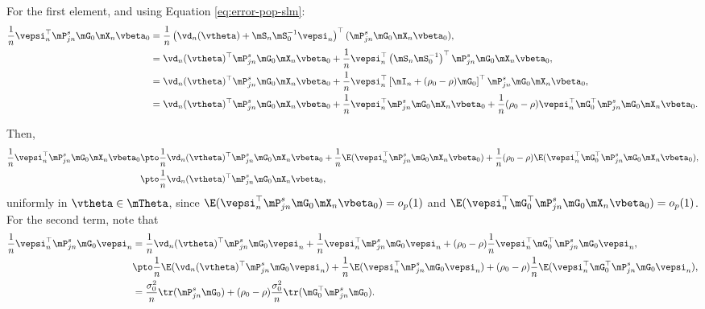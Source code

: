 \documentclass[english,12pt]{book}\usepackage[]{graphicx}\usepackage[]{xcolor}
\begin{document}
For the first element, and using Equation \eqref{eq:error-pop-slm}:
\begin{equation*}
\begin{aligned}
\frac{1}{n}\vepsi_n^\top \mP_{jn}^s\mG_0\mX_n\vbeta_0  & = \frac{1}{n}\left(\vd_n(\vtheta) + \mS_n\mS_0^{-1}\vepsi_n\right)^\top (\mP_{jn}^s\mG_0\mX_n\vbeta_0), \\
& =\vd_n(\vtheta)^\top\mP_{jn}^s\mG_0\mX_n\vbeta_0 + \frac{1}{n}\vepsi_n^\top\left(\mS_n\mS_0^{-1}\right)^\top\mP_{jn}^s\mG_0\mX_n\vbeta_0, \\
& = \vd_n(\vtheta)^\top\mP_{jn}^s\mG_0\mX_n\vbeta_0  + \frac{1}{n}\vepsi_n^\top\left[\mI_n + (\rho_0 - \rho)\mG_0\right]^\top\mP_{jn}^s\mG_0\mX_n\vbeta_0, \\
& = \vd_n(\vtheta)^\top\mP_{jn}^s\mG_0\mX_n\vbeta_0 + \frac{1}{n}\vepsi_n^\top\mP_{jn}^s\mG_0\mX_n\vbeta_0 + \frac{1}{n}(\rho_0 - \rho)\vepsi_n^\top\mG_0^\top\mP_{jn}^s\mG_0\mX_n\vbeta_0.
\end{aligned}
\end{equation*}

Then, 
\begin{equation*}
\begin{aligned}
\frac{1}{n}\vepsi_n^\top \mP_{jn}^s\mG_0\mX_n\vbeta_0 &\pto \frac{1}{n}\vd_n(\vtheta)^\top\mP_{jn}^s\mG_0\mX_n\vbeta_0 + \frac{1}{n}\E(\vepsi_n^\top\mP_{jn}^s\mG_0\mX_n\vbeta_0) +\frac{1}{n}(\rho_0 - \rho)\E(\vepsi_n^\top\mG_0^\top\mP_{jn}^s\mG_0\mX_n\vbeta_0), \\
&\pto \frac{1}{n}\vd_n(\vtheta)^\top\mP_{jn}^s\mG_0\mX_n\vbeta_0, 
\end{aligned}
\end{equation*}
%
uniformly in $\vtheta \in \mTheta$, since $\E(\vepsi_n^\top\mP_{jn}^s\mG_0\mX_n\vbeta_0) = o_p(1)$ and $\E(\vepsi_n^\top\mG_0^\top\mP_{jn}^s\mG_0\mX_n\vbeta_0) = o_p(1)$. For the second term, note that
\begin{equation*}
\begin{aligned}
\frac{1}{n}\vepsi_n^\top\mP_{jn}^s\mG_0\vepsi_n & = \frac{1}{n}\vd_n(\vtheta)^\top\mP_{jn}^s\mG_0\vepsi_n + \frac{1}{n}\vepsi_n^\top\mP^s_{jn}\mG_0\vepsi_n + (\rho_0 - \rho)\frac{1}{n}\vepsi_n^\top\mG_0^\top\mP^s_{jn}\mG_{0}\vepsi_n, \\
& \pto \frac{1}{n}\E(\vd_n(\vtheta)^\top\mP_{jn}^s\mG_0\vepsi_n) + \frac{1}{n}\E(\vepsi_n^\top\mP^s_{jn}\mG_0\vepsi_n) + (\rho_0 - \rho)\frac{1}{n}\E(\vepsi_n^\top\mG_0^\top\mP^s_{jn}\mG_{0}\vepsi_n), \\
& = \frac{\sigma_0^2}{n}\tr(\mP_{jn}^s\mG_0) + (\rho_0 - \rho)\frac{\sigma_0^2}{n}\tr(\mG_0^\top\mP_{jn}^s\mG_0).
\end{aligned}
\end{equation*}
\end{document}
